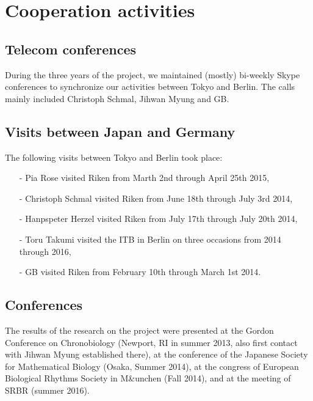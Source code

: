 \documentclass[a4paper]{article}
\begin{document}
\section{Cooperation activities}

\subsection{Telecom conferences}
During the three years of the project, we maintained (mostly)
bi-weekly Skype conferences to synchronize our activities between
Tokyo and Berlin. The calls mainly included Christoph Schmal, Jihwan
Myung and GB.

\subsection{Visits between Japan and Germany}
The following visits between Tokyo and Berlin took place:
\begin{itemize}
  \item[-] Pia Rose visited Riken from Marth 2nd through April 25th 2015,
  \item[-] Christoph Schmal visited Riken from June 18th through July 3rd
  2014,
  \item[-] Hanpspeter Herzel visited Riken from July 17th through July
  20th 2014,
  \item[-] Toru Takumi visited the ITB in Berlin on three occasions from
  2014 through 2016,
  \item[-] GB visited Riken from February 10th through March 1st 2014.
\end{itemize}

\subsection{Conferences}
The results of the research on the project were presented at the
Gordon Conference on Chronobiology (Newport, RI in summer 2013, also
first contact with Jihwan Myung established there), at the conference
of the Japanese Society for Mathematical Biology (Osaka, Summer 2014),
at the congress of European Biological Rhythms Society in M\&unchen
(Fall 2014), and at the meeting of SRBR (summer 2016).



\end{document}
